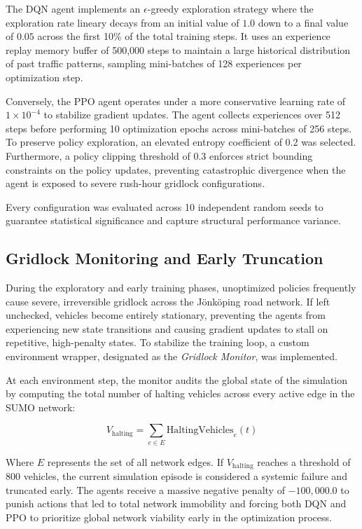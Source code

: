 \documentclass[conference]{IEEEtran}
\begin{document}
The DQN agent implements an $\epsilon$-greedy exploration strategy where the exploration rate lineary decays from an initial value of $1.0$ down to a final value of $0.05$ across the first 10\% of the total training steps. It uses an experience replay memory buffer of 500,000 steps to maintain a large historical distribution of past traffic patterns, sampling mini-batches of 128 experiences per optimization step.

Conversely, the PPO agent operates under a more conservative learning rate of $1 \times 10^{-4}$ to stabilize gradient updates. The agent collects experiences over 512 steps before performing 10 optimization epochs across mini-batches of 256 steps. To preserve policy exploration, an elevated entropy coefficient of 0.2 was selected. Furthermore, a policy clipping threshold of 0.3 enforces strict bounding constraints on the policy updates, preventing catastrophic divergence when the agent is exposed to severe rush-hour gridlock configurations.

Every configuration was evaluated across 10 independent random seeds to guarantee statistical significance and capture structural performance variance.

\subsection{Gridlock Monitoring and Early Truncation}
During the exploratory and early training phases, unoptimized policies frequently cause severe, irreversible gridlock across the Jönköping road network. If left unchecked, vehicles become entirely stationary, preventing the agents from experiencing new state transitions and causing gradient updates to stall on repetitive, high-penalty states. To stabilize the training loop, a custom environment wrapper, designated as the \textit{Gridlock Monitor}, was implemented. 

At each environment step, the monitor audits the global state of the simulation by computing the total number of halting vehicles across every active edge in the SUMO network:

\begin{equation}
    V_{\text{halting}} = \sum_{e \in E} \text{HaltingVehicles}_e(t)
\end{equation}

Where $E$ represents the set of all network edges. If $V_{\text{halting}}$ reaches a threshold of $800$ vehicles, the current simulation episode is considered a systemic failure and truncated early. The agents receive a massive negative penalty of $-100,000.0$ to punish actions that led to total network immobility and forcing both DQN and PPO to prioritize global network viability early in the optimization process.
\end{document}
